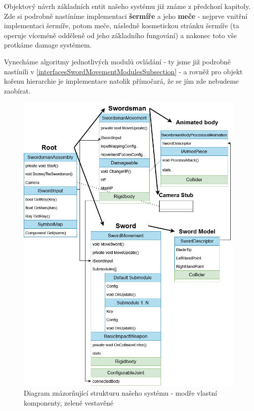 Objektový návrh základních entit našeho systému již známe z předchozí kapitoly. Zde si podrobně nastíníme implementaci \textbf{šermíře} a jeho \textbf{meče} - nejprve vnitřní implementaci šermíře, potom meče, následně kosmetickou stránku šermíře (ta operuje víceméně odděleně od jeho základního fungování) a nakonec toto vše protkáme damage systémem. 

Vynecháme algoritmy jednotlivých modulů ovládání - ty jsme již podrobně nastínili v \ref{interfacesSwordMovementModulesSubsection} - a rovněž pro objekt kořenu hierarchie je implementace natolik přímočará, že se jím zde nebudeme zaobírat. 


\begin{figure}[p]\centering
  \center
  \includegraphics[width=145mm]{../img/Structure-diagram-impl.png}
  \caption{Diagram znázorňující strukturu našeho systému - modře vlastní komponenty, zeleně vestavěné}
  \label{obr05:objectModelDiagramReprise}
\end{figure} 
 
